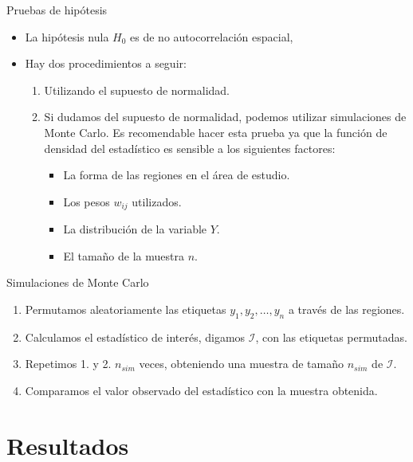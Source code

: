 \documentclass{beamer}
\begin{document}
\begin{frame}{Pruebas de hipótesis}
  \begin{itemize}
    \item La hipótesis nula $H_0$ es de no autocorrelación espacial,
    \item Hay dos procedimientos a seguir:
    \begin{enumerate}
      \item Utilizando el supuesto de normalidad.
      \item Si dudamos del supuesto de normalidad, podemos utilizar simulaciones de Monte Carlo.
      Es recomendable hacer esta prueba ya que la función de densidad del estadístico es sensible a los siguientes factores:
      \begin{itemize}
        \item La forma de las regiones en el área de estudio.
        \item Los pesos $w_{ij}$ utilizados.
        \item La distribución de la variable $Y$.
        \item El tamaño de la muestra $n$.
      \end{itemize} 
    \end{enumerate}
  \end{itemize}
\end{frame}

\begin{frame}{Simulaciones de Monte Carlo}
    \begin{enumerate}
    \item Permutamos aleatoriamente las etiquetas $y_1, y_2, \dots, y_n$ a través de las regiones. 
    \item Calculamos el estadístico de interés, digamos $\mathcal{I}$, con las etiquetas permutadas. 
    \item Repetimos 1. y 2. $n_{sim}$ veces, obteniendo una muestra de tamaño $n_{sim}$ de $\mathcal{I}$. 
    \item Comparamos el valor observado del estadístico con la muestra obtenida. 
    \end{enumerate}
\end{frame}

\section{Resultados}
\end{document}
